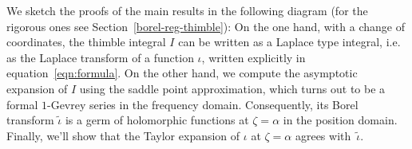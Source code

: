 \documentclass{article}
\let\Re\relax
\DeclareMathOperator{\Re}{Re}
\newcommand{\C}{\mathbb{C}}
\newcommand{\series}[1]{\tilde{#1}}
\newcommand{\fracderiv}[3]{\partial^{#1}_{#2, #3}}
\newcommand*{\defeq}{\mathrel{\vcenter{\baselineskip0.5ex \lineskiplimit0pt
                     \hbox{\scriptsize.}\hbox{\scriptsize.}}}%
                     =}
\newcommand{\laplace}{\mathcal{L}}
\newcommand{\borel}{\mathcal{B}}
\newcommand{\aexp}{\text{\ae}}
\theoremstyle{definition}
\theoremstyle{plain}
\newtheorem{theorem}{Theorem}[section]
\begin{document}
\color{RoyalBlue}
We sketch the proofs of the main results in the following diagram (for the rigorous ones see Section~\ref{borel-reg-thimble}):
On the one hand, with a change of coordinates, the thimble integral $I$ can be written as a Laplace type integral, i.e. as the Laplace transform of a function $\iota$, written explicitly in equation~\eqref{eqn:formula}. 
On the other hand, we compute the asymptotic expansion of $I$ using the saddle point approximation, which turns out to be a formal $1$-Gevrey series in the frequency domain. Consequently, its Borel transform $\series{\iota}$ is a germ of holomorphic functions at $\zeta=\alpha$ in the position domain. Finally, we'll show that the Taylor expansion of $\iota$ at $\zeta=\alpha$ agrees with~$\tilde{\iota}$. 
\end{document}
